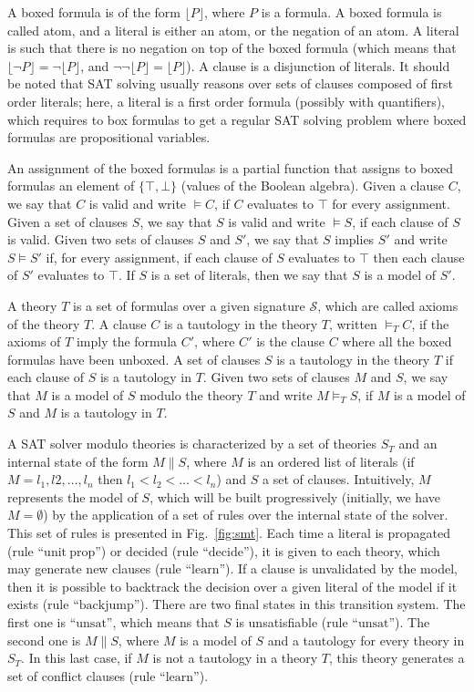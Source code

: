 A boxed formula is of the form $\lfloor{}P\rfloor$, where $P$ is a formula. A
boxed formula is called atom, and a literal is either an atom, or the negation
of an atom. A literal is such that there is no negation on top of the boxed
formula (which means that $\lfloor\neg{}P\rfloor=\neg\lfloor{}P\rfloor$, and
$\neg\neg\lfloor{}P\rfloor=\lfloor{}P\rfloor$). A clause is a disjunction of
literals. It should be noted that SAT solving usually reasons over sets of
clauses composed of first order literals; here, a literal is a first order
formula (possibly with quantifiers), which requires to box formulas to get a
regular SAT solving problem where boxed formulas are propositional variables.

An assignment of the boxed formulas is a partial function that assigns to boxed
formulas an element of $\{\top,\bot\}$ (values of the Boolean algebra). Given a
clause $C$, we say that $C$ is valid and write $\models{}C$, if $C$ evaluates to
$\top$ for every assignment. Given a set of clauses $S$, we say that $S$ is
valid and write $\models{}S$, if each clause of $S$ is valid. Given two sets of
clauses $S$ and $S'$, we say that $S$ implies $S'$ and write $S\models{}S'$ if,
for every assignment, if each clause of $S$ evaluates to $\top$ then each clause
of $S'$ evaluates to $\top$. If $S$ is a set of literals, then we say that $S$
is a model of $S'$.

A theory $T$ is a set of formulas over a given signature $\mathcal{S}$, which
are called axioms of the theory $T$. A clause $C$ is a tautology in the theory
$T$, written $\models_TC$, if the axioms of $T$ imply the formula $C'$, where
$C'$ is the clause $C$ where all the boxed formulas have been unboxed. A set of
clauses $S$ is a tautology in the theory $T$ if each clause of $S$ is a
tautology in $T$. Given two sets of clauses $M$ and $S$, we say that $M$ is a
model of $S$ modulo the theory $T$ and write $M\models_TS$, if $M$ is a model of
$S$ and $M$ is a tautology in $T$.

A SAT solver modulo theories is characterized by a set of theories $S_T$ and an
internal state of the form $M\parallel{}S$, where $M$ is an ordered list of
literals (if $M=l_1,l2,\ldots,l_n$ then $l_1<l_2<\ldots<l_n$) and $S$ a set of
clauses. Intuitively, $M$ represents the model of $S$, which will be built
progressively (initially, we have $M=\emptyset$) by the application of a set of
rules over the internal state of the solver. This set of rules is presented in
Fig.~\ref{fig:smt}. Each time a literal is propagated (rule
``$\mathrm{unit~prop}$'') or decided (rule ``$\mathrm{decide}$''), it is given
to each theory, which may generate new clauses (rule ``$\mathrm{learn}$''). If a
clause is unvalidated by the model, then it is possible to backtrack the
decision over a given literal of the model if it exists (rule
``$\mathrm{backjump}$''). There are two final states in this transition
system. The first one is ``$\mathrm{unsat}$'', which means that $S$ is
unsatisfiable (rule ``$\mathrm{unsat}$''). The second one is $M\parallel{}S$,
where $M$ is a model of $S$ and a tautology for every theory in $S_T$. In this
last case, if $M$ is not a tautology in a theory $T$, this theory generates a
set of conflict clauses (rule ``$\mathrm{learn}$'').

